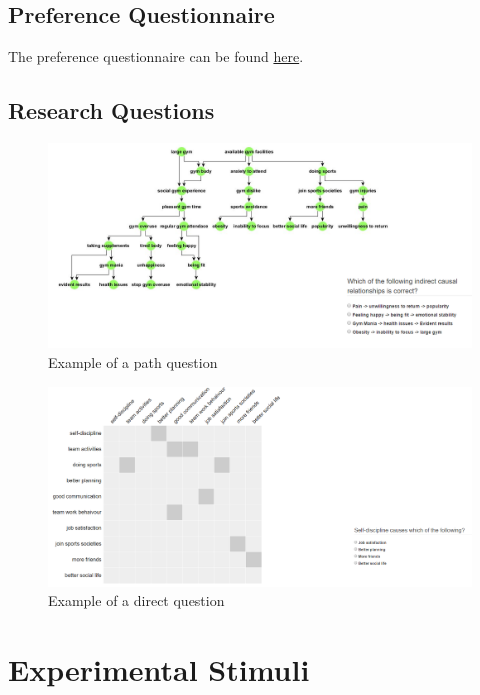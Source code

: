 \documentclass{l4proj}
\begin{document}
\begin{appendices}
\section{Preference Questionnaire}
\label{preference}
The preference questionnaire can be found \href{https://docs.google.com/forms/d/e/1FAIpQLSeEKichG31qd8Ba88OqcTDvYKJLk-Xf8oWBELAJMx0QDHbe-g/viewform?usp=sf_link}{here}.
\section{Research Questions}

\begin{figure}
\centering
\includegraphics[width=24cm]{exampleQuestion.PNG}
\caption{Example of a path question}
\label{exampleQuestion}
\end{figure}


\begin{figure}
\centering
\includegraphics[width=24cm]{images/directQ.PNG}
\caption{Example of a direct question}
\label{directQ}
\end{figure}


\chapter{Experimental Stimuli}
\label{expStim}


\end{appendices}
\end{document}
